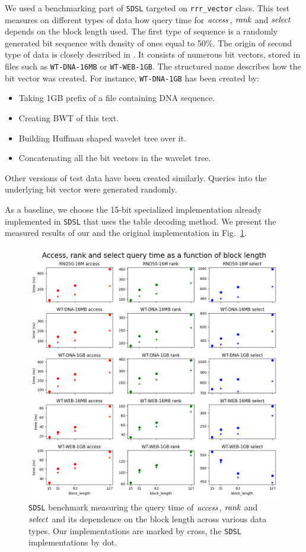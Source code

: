 We used a benchmarking part of \texttt{SDSL} targeted on \verb'rrr_vector' class. This test
measures on different types of data how query time for $\mathit{access}$, $\mathit{rank}$ and $\mathit{select}$ depends
on the block length used. The first type of sequence is a randomly generated bit sequence with
density of ones equal to 50\%. The origin of second type of data is closely described in
\cite{gog2014optimized}. It consists of numerous bit vectors, stored in files such as
\texttt{WT-DNA-16MB} or \texttt{WT-WEB-1GB}. The structured name describes how the bit vector
was created. For instance, \texttt{WT-DNA-1GB} has been created by:
\begin{itemize}
	\item Taking 1GB prefix of a file containing DNA sequence.
	\item Creating BWT of this text.
	\item Building Huffman shaped wavelet tree over it.
	\item Concatenating all the bit vectors in the wavelet tree.
\end{itemize}
Other versions of test data have been created similarly. Queries into the underlying bit vector
were generated randomly.

As a baseline, we choose the 15-bit specialized implementation already implemented in \texttt{SDSL}
that uses the table decoding method. We present the measured results of our and the original
implementation in Fig.~\ref{obr:benchmark_sdsl_new_method}.

\begin{figure}
	\centerline{
		\includegraphics[width=\textwidth, height=0.7\textheight]{images/benchmark_sdsl_new_method}
	}
	\caption[TODO]{\texttt{SDSL} benchmark measuring the query time of $\mathit{access}$, $\mathit{rank}$ and $\mathit{select}$
	and its dependence on the block length across various data types. Our implementations are marked
	by cross, the \texttt{SDSL} implementations by dot.
	}
	\label{obr:benchmark_sdsl_new_method}
\end{figure}


